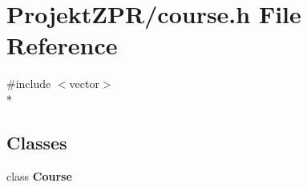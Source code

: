 \section{Projekt\-Z\-P\-R/course.h File Reference}
\label{course_8h}
{\ttfamily \#include $<$vector$>$}\\*
\subsection*{Classes}
\begin{DoxyCompactItemize}
\item 
class {\bf Course}
\end{DoxyCompactItemize}
